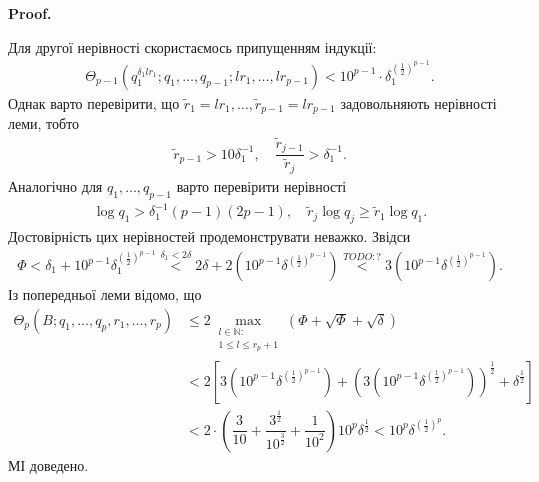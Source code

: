 \documentclass[a4paper, 10pt]{article}
\makeatletter
\theoremstyle{theoremdd}
\theoremstyle{theoremdd}
\theoremstyle{theoremdd}
\theoremstyle{theoremdd}
\theoremstyle{theoremdd}
\theoremstyle{theoremdd}
\theoremstyle{theoremdd}
\theoremstyle{theoremdd}
\theoremstyle{theoremdd}
\theoremstyle{theoremdd}
\theoremstyle{theoremdd}
\theoremstyle{theoremdd}
\theoremstyle{theoremdd}
\theoremstyle{theoremdd}
\theoremstyle{theoremdd}
\renewenvironment{proof}[1][Proof.\\]{\par
\pushQED{\hfill \qed}%
\normalfont \topsep6\p@\@plus6\p@\relax
\trivlist
\item\relax
{\bfseries
#1\@addpunct{.}}\hspace\labelsep\ignorespaces
}{%
\popQED\endtrivlist\@endpefalse
}
\makeatother
\begin{document}
\begin{proof}
Для другої нерівності скористаємось припущенням індукції:
\begin{align*}
\Theta_{p-1}(q_1^{\delta_1 l r_1};q_1,\dots,q_{p-1};lr_1,\dots,lr_{p-1}) < 10^{p-1} \cdot \delta_1^{\left( \frac{1}{2} \right)^{p-1}}.
\end{align*}
Однак варто перевірити, що $\tilde{r}_1 = lr_1,\dots, \tilde{r}_{p-1} = lr_{p-1}$ задовольняють нерівності леми, тобто
\begin{align*}
\tilde{r}_{p-1} > 10\delta_1^{-1},\quad \dfrac{\tilde{r}_{j-1}}{\tilde{r}_j} > \delta_1^{-1}.
\end{align*}
Аналогічно для $q_1,\dots,q_{p-1}$ варто перевірити нерівності
\begin{align*}
\log q_1 > \delta_1^{-1} (p-1) (2p-1), \quad \tilde{r}_j \log q_j \geq \tilde{r}_1 \log q_1.
\end{align*}
Достовірність цих нерівностей продемонструвати неважко. Звідси
\begin{align*}
\Phi < \delta_1 + 10^{p-1} \delta_1^{\left( \frac{1}{2} \right)^{p-1}} \overset{\delta_1 < 2 \delta}{<} 2 \delta + 2 \left( 10^{p-1} \delta^{\left( \frac{1}{2} \right)^{p-1}} \right) \overset{TODO:?}{<} 3 \left( 10^{p-1} \delta^{\left( \frac{1}{2} \right)^{p-1}} \right).
\end{align*}
Із попередньої леми відомо, що
\begin{align*}
\Theta_p(B;q_1,\dots,q_p,r_1,\dots,r_p) & \leq 2 \max_{\substack{l \in \mathbb{N}: \\ 1 \leq l \leq r_p+1 }} (\Phi + \sqrt{\Phi} + \sqrt{\delta}) \\
& < 2 \left[ 3 \left( 10^{p-1} \delta^{\left( \frac{1}{2} \right)^{p-1}} \right) + \left( 3 \left( 10^{p-1} \delta^{\left( \frac{1}{2} \right)^{p-1}} \right) \right)^{\frac{1}{2}} + \delta^{\frac{1}{2}} \right] \\
& < 2 \cdot \left( \dfrac{3}{10} + \dfrac{3^{\frac{1}{2}}}{10^{\frac{3}{2}}} + \dfrac{1}{10^2} \right) 10^p \delta^{\frac{1}{2}} < 10^{p} \delta^{\left( \frac{1}{2} \right)^p}.
\end{align*}
МІ доведено.
\end{proof}
\end{document}
